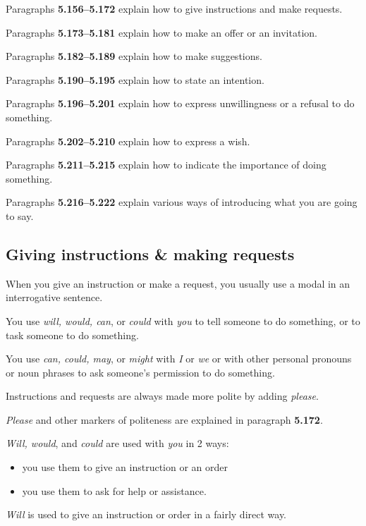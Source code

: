 \documentclass[oneside]{book}
\numberwithin{equation}{section}
\begin{document}
%
Paragraphs \textbf{5.156--5.172} explain how to give instructions and make requests.

%
Paragraphs \textbf{5.173--5.181} explain how to make an offer or an invitation.

%
Paragraphs \textbf{5.182--5.189} explain how to make suggestions.

%
Paragraphs \textbf{5.190--5.195} explain how to state an intention.

%
Paragraphs \textbf{5.196--5.201} explain how to express unwillingness or a refusal to do something.

%
Paragraphs \textbf{5.202--5.210} explain how to express a wish.

%
Paragraphs \textbf{5.211--5.215} explain how to indicate the importance of doing something.

%
Paragraphs \textbf{5.216--5.222} explain various ways of introducing what you are going to say.

\subsection{Giving instructions \& making requests}
\noindent{} When you give an instruction or make a request, you usually use a modal in an interrogative sentence.

%
You use \textit{will, would, can}, or \textit{could} with \textit{you} to tell someone to do something, or to task someone to do something.

%
You use \textit{can, could, may}, or \textit{might} with \textit{I} or \textit{we} or with other personal pronouns or noun phrases to ask someone's permission to do something.

%
Instructions and requests are always made more polite by adding \textit{please}.

\textit{Please} and other markers of politeness are explained in paragraph \textbf{5.172}.

%
\noindent{} \textit{Will, would}, and \textit{could} are used with \textit{you} in 2 ways:
\begin{itemize}
    \item you use them to give an instruction or an order
    \item you use them to ask for help or assistance.
\end{itemize}
%
\noindent{} \textit{Will} is used to give an instruction or order in a fairly direct way.
\end{document}
